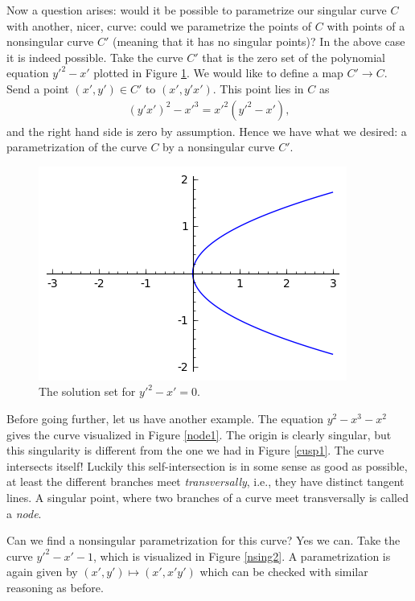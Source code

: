 \documentclass[12pt,a4paper,leqno]{article}
\newcommand{\fref}[1]{\hyperref[{#1}]{\ref*{#1}}}
\theoremstyle{plain}
\theoremstyle{definition}
\theoremstyle{remark}
\begin{document}
Now a question arises: would it be possible to parametrize our singular curve $C$ with another, nicer, curve: could we parametrize the points of $C$ with points of a nonsingular curve $C'$ (meaning that it has no singular points)? In the above case it is indeed possible. Take the curve $C'$ that is the zero set of the polynomial equation $y'^2 - x'$ plotted in Figure \fref{nsing1}. We would like to define a map $C' \to C$. Send a point $(x',y') \in C'$ to $(x',y'x')$. This point lies in $C$ as
\begin{align*}
\left( y'x' \right) ^ 2 - x'^3 = x'^2 (y'^2 - x'),
\end{align*}
and the right hand side is zero by assumption. Hence we have what we desired: a parametrization of the curve $C$ by a nonsingular curve $C'$.

\begin{figure}\label{nsing1}
\begin{center}
\includegraphics{pics/parabola.png}
\caption{The solution set for $y'^2 - x' = 0$.}
\end{center}
\end{figure}

Before going further, let us have another example. The equation $y^2 - x^3 - x^2$ gives the curve visualized in Figure \fref{node1}. The origin is clearly singular, but this singularity is different from the one we had in Figure \fref{cusp1}. The curve intersects itself! Luckily this self-intersection is in some sense as good as possible, at least the different branches meet \emph{transversally}, i.e., they have distinct tangent lines. A singular point, where two branches of a curve meet transversally is called a \emph{node}. 

Can we find a nonsingular parametrization for this curve? Yes we can. Take the curve $y'^2 - x' - 1$, which is visualized in Figure \fref{nsing2}. A parametrization is again given by $(x', y') \mapsto (x', x'y')$ which can be checked with similar reasoning as before.
\end{document}
